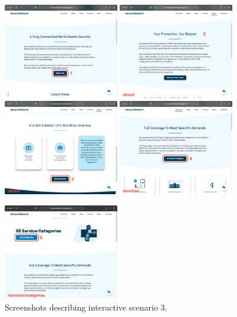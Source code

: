 \documentclass[12pt]{report}
\begin{document}
\begin{figure}[H]
	\centering
	\includegraphics[width=0.45\textwidth]{scenarios/3/1.png}
	\includegraphics[width=0.45\textwidth]{scenarios/3/2.png}
	\includegraphics[width=0.45\textwidth]{scenarios/3/3.png}
	\includegraphics[width=0.45\textwidth]{scenarios/3/4.png}
\end{figure}
\begin{figure}[H]
	\centering
	\includegraphics[width=0.45\textwidth]{scenarios/3/5.png}
	\caption{Screenshots describing interactive scenario 3.}
\end{figure}
\end{document}
